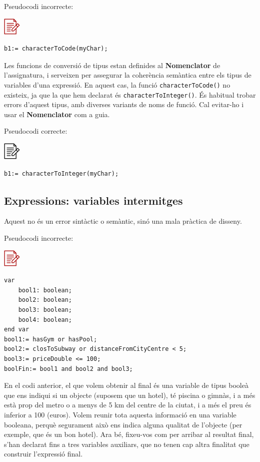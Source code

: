 \documentclass[
]{book}
\begin{document}
Pseudocodi incorrecte:

\includegraphics{./img/alg_err.png}

\begin{verbatim}
b1:= characterToCode(myChar);
\end{verbatim}

Les funcions de conversió de tipus estan definides al \textbf{Nomenclator} de l'assignatura, i serveixen per assegurar la coherència semàntica entre els tipus de variables d'una expressió. En aquest cas, la funció \texttt{characterToCode()} no existeix, ja que la que hem declarat és \texttt{characterToInteger()}. És habitual trobar errors d'aquest tipus, amb diverses variants de noms de funció. Cal evitar-ho i usar el \textbf{Nomenclator} com a guia.

Pseudocodi correcte:

\includegraphics{./img/alg.png}

\begin{verbatim}
b1:= characterToInteger(myChar);
\end{verbatim}

\hypertarget{expressions-variables-intermitges}{%
\subsection{Expressions: variables intermitges}\label{expressions-variables-intermitges}}

Aquest no és un error sintàctic o semàntic, sinó una mala pràctica de disseny.

Pseudocodi incorrecte:

\includegraphics{./img/alg_err.png}

\begin{verbatim}
var
    bool1: boolean;
    bool2: boolean;
    bool3: boolean;
    bool4: boolean;
end var
bool1:= hasGym or hasPool;
bool2:= closToSubway or distanceFromCityCentre < 5;
bool3:= priceDouble <= 100;
boolFin:= bool1 and bool2 and bool3;
\end{verbatim}

En el codi anterior, el que volem obtenir al final és una variable de tipus booleà que ens indiqui si un objecte (suposem que un hotel), té piscina o gimnàs, i a més està prop del metro o a menys de 5 km del centre de la ciutat, i a més el preu és inferior a 100 (euros). Volem reunir tota aquesta informació en una variable booleana, perquè segurament això ens indica alguna qualitat de l'objecte (per exemple, que és un bon hotel). Ara bé, fixeu-vos com per arribar al resultat final, s'han declarat fins a tres variables auxiliars, que no tenen cap altra finalitat que construir l'expressió final.
\end{document}
